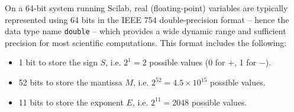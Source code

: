 		On a 64-bit system running Scilab, real (floating-point) variables are typically represented using 64 bits in the IEEE 754 double-precision format -- hence the data type name \texttt{double} -- which provides a wide dynamic range and sufficient precision for most scientific computations. This format includes the following:
		\begin{itemize}
			\item 1 bit to store the sign $S$, i.e. $2^1=2$ possible values (0 for $+$, 1 for $-$).
			\item 52 bits to store the mantissa $M$, i.e. $2^{52}=4.5\times 10^{15}$ possible values.
			\item 11 bits to store the exponent $E$, i.e. $2^{11}=2048$ possible values.
		\end{itemize}
		
